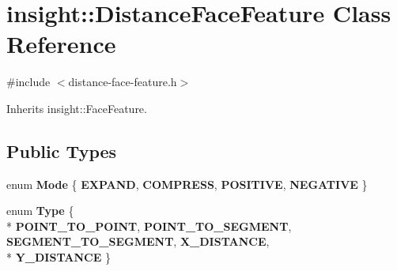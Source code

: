 \hypertarget{classinsight_1_1DistanceFaceFeature}{}\section{insight\+:\+:Distance\+Face\+Feature Class Reference}
\label{classinsight_1_1DistanceFaceFeature}


{\ttfamily \#include $<$distance-\/face-\/feature.\+h$>$}



Inherits insight\+::\+Face\+Feature.

\subsection*{Public Types}
\begin{DoxyCompactItemize}
\item 
enum {\bfseries Mode} \{ {\bfseries E\+X\+P\+A\+ND}, 
{\bfseries C\+O\+M\+P\+R\+E\+SS}, 
{\bfseries P\+O\+S\+I\+T\+I\+VE}, 
{\bfseries N\+E\+G\+A\+T\+I\+VE}
 \}\hypertarget{classinsight_1_1DistanceFaceFeature_a765368d2dbf5841b54099e60fba73e57}{}\label{classinsight_1_1DistanceFaceFeature_a765368d2dbf5841b54099e60fba73e57}

\item 
enum {\bfseries Type} \{ \\*
{\bfseries P\+O\+I\+N\+T\+\_\+\+T\+O\+\_\+\+P\+O\+I\+NT}, 
{\bfseries P\+O\+I\+N\+T\+\_\+\+T\+O\+\_\+\+S\+E\+G\+M\+E\+NT}, 
{\bfseries S\+E\+G\+M\+E\+N\+T\+\_\+\+T\+O\+\_\+\+S\+E\+G\+M\+E\+NT}, 
{\bfseries X\+\_\+\+D\+I\+S\+T\+A\+N\+CE}, 
\\*
{\bfseries Y\+\_\+\+D\+I\+S\+T\+A\+N\+CE}
 \}\hypertarget{classinsight_1_1DistanceFaceFeature_a0afb7a1457ea3fc7c30e99fa549abf01}{}\label{classinsight_1_1DistanceFaceFeature_a0afb7a1457ea3fc7c30e99fa549abf01}

\end{DoxyCompactItemize}
